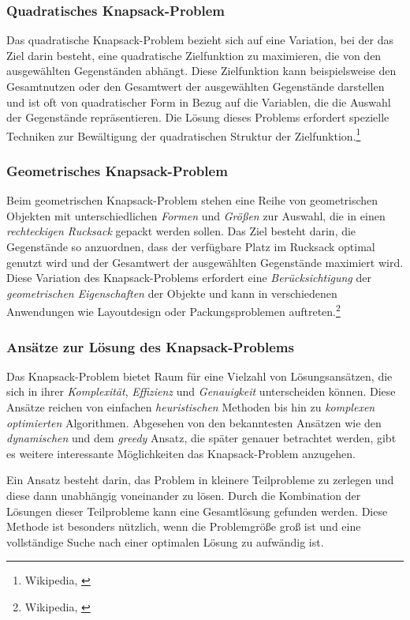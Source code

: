 \begin{itemize}
\subsubsection*{Quadratisches Knapsack-Problem}
Das quadratische Knapsack-Problem bezieht sich auf eine Variation, bei der das Ziel darin besteht, eine quadratische
Zielfunktion zu maximieren, die von den ausgewählten Gegenständen abhängt. Diese Zielfunktion kann beispielsweise den
Gesamtnutzen oder den Gesamtwert der ausgewählten Gegenstände darstellen und ist oft von quadratischer Form in Bezug auf
die Variablen, die die Auswahl der Gegenstände repräsentieren. Die Lösung dieses Problems erfordert spezielle Techniken
zur Bewältigung der quadratischen Struktur der Zielfunktion.\footnote{Wikipedia, \cite{Quadratic Knapsack-Problem}}

\subsubsection*{Geometrisches Knapsack-Problem}
Beim geometrischen Knapsack-Problem stehen eine Reihe von geometrischen Objekten mit unterschiedlichen \textit{Formen}
und \textit{Größen} zur Auswahl, die in einen \textit{rechteckigen Rucksack} gepackt werden sollen. Das Ziel besteht
darin, die Gegenstände so anzuordnen, dass der verfügbare Platz im Rucksack optimal genutzt wird und der Gesamtwert der
ausgewählten Gegenstände maximiert wird. Diese Variation des Knapsack-Problems erfordert eine \textit{Berücksichtigung}
der \textit{geometrischen Eigenschaften} der Objekte und kann in verschiedenen Anwendungen wie Layoutdesign oder
Packungsproblemen auftreten.\footnote{Wikipedia, \cite{Geometric Knapsack-Problem}}

\subsubsection{Ansätze zur Lösung des Knapsack-Problems}
Das Knapsack-Problem bietet Raum für eine Vielzahl von Lösungsansätzen, die sich in ihrer \textit{Komplexität},
\textit{Effizienz} und \textit{Genauigkeit} unterscheiden können. Diese Ansätze reichen von einfachen \textit{heuristischen}
Methoden bis hin zu \textit{komplexen optimierten} Algorithmen. Abgesehen von den bekanntesten Ansätzen wie den
\textit{dynamischen} und dem \textit{greedy} Ansatz, die später genauer betrachtet werden, gibt es weitere interessante
Möglichkeiten das Knapsack-Problem anzugehen.

Ein Ansatz besteht darin, das Problem in kleinere Teilprobleme zu zerlegen und diese dann unabhängig voneinander zu lösen.
Durch die Kombination der Lösungen dieser Teilprobleme kann eine Gesamtlösung gefunden werden. Diese Methode ist besonders
nützlich, wenn die Problemgröße groß ist und eine vollständige Suche nach einer optimalen Lösung zu aufwändig ist.


\end{itemize}

